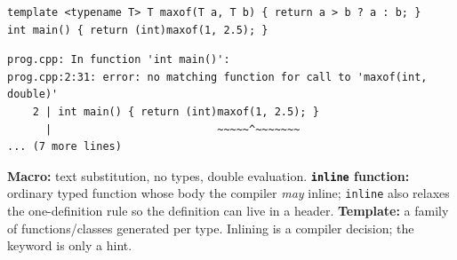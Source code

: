 \documentclass[10pt,a4paper,openany,oneside]{report}
\begin{document}
\begin{lstlisting}[language={[11]C++},title={max(1, 2.5): conflicting deduction}]
template <typename T> T maxof(T a, T b) { return a > b ? a : b; }
int main() { return (int)maxof(1, 2.5); }
\end{lstlisting}
\begin{lstlisting}[style=out]
prog.cpp: In function 'int main()':
prog.cpp:2:31: error: no matching function for call to 'maxof(int, double)'
    2 | int main() { return (int)maxof(1, 2.5); }
      |                          ~~~~~^~~~~~~~
... (7 more lines)
\end{lstlisting}

\begin{tipbox}
\textbf{Macro:} text substitution, no types, double evaluation. \textbf{\texttt{inline} function:} ordinary typed function whose body the compiler \emph{may} inline; \texttt{inline} also relaxes the one-definition rule so the definition can live in a header. \textbf{Template:} a family of functions/classes generated per type. Inlining is a compiler decision; the keyword is only a hint.
\end{tipbox}
\end{document}
